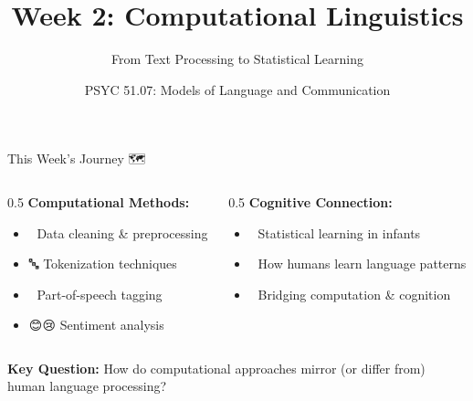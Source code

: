 \documentclass[aspectratio=169]{beamer}
\title{Week 2: Computational Linguistics}
\subtitle{From Text Processing to Statistical Learning}
\author{PSYC 51.07: Models of Language and Communication}
\date{}
\begin{document}
\begin{frame}
    \titlepage
\end{frame}

\begin{frame}[shrink=10]{This Week's Journey 🗺️}
    \begin{columns}[T]
        \begin{column}{0.5\textwidth}
            \textbf{Computational Methods:}
            \begin{itemize}\setlength{\itemsep}{0pt}
                \item 📝 Data cleaning \& preprocessing
                \item 🔤 Tokenization techniques
                \item 🎯 Part-of-speech tagging
                \item 😊😢 Sentiment analysis
            \end{itemize}
        \end{column}
        \begin{column}{0.5\textwidth}
            \textbf{Cognitive Connection:}
            \begin{itemize}\setlength{\itemsep}{0pt}
                \item 👶 Statistical learning in infants
                \item 🧠 How humans learn language patterns
                \item 🤔 Bridging computation \& cognition
            \end{itemize}
        \end{column}
    \end{columns}

    \vspace{1em}
    \begin{center}
        \textbf{Key Question:} How do computational approaches mirror (or differ from) human language processing?
    \end{center}
\end{frame}
\end{document}
